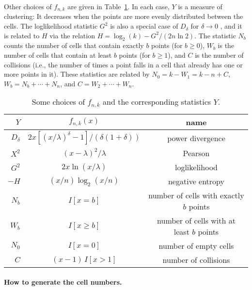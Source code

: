 Other choices of $f_{n,k}$ are given in Table~\ref{tab:choosef}.
In each case, $Y$ is a measure of clustering: It decreases
when the points are more evenly distributed between the cells.
The loglikelihood statistic $G^2$ is also a
  special case of $D_\delta$
for $\delta\to 0$ \cite{tREA88a}, and it is related to $H$ via the relation
$H = \log_2(k) - {G^2 / (2n \ln 2)}$.
The statistic $N_b$ counts the number of cells that
contain exactly $b$ points (for $b\ge 0$), $W_b$ is the number of cells that
contain at least $b$ points (for $b\ge 1$),  %
and $C$ is the number of collisions
(i.e., the number of times a point falls in
a cell that already has one or more points in it).
These statistics are related by $N_0 = k - W_1 = k - n + C$,
$W_b = N_b + \cdots + N_n$, and $C = W_2 + \cdots + W_n$.


\begin{table}[htb]
\caption {Some choices of $f_{n,k}$ and the corresponding statistics $Y$.}
\label {tab:choosef}
\smallskip
\centering
\renewcommand {\arraystretch}{1.2}
\begin{tabular}{|rcc|}
\hline
 $Y$        & $f_{n,k}(x)$             &    name  \\
\hline
 $D_\delta$ & $2x[(x/\lambda)^\delta-1]/(\delta(1+\delta)) $
                                       & power divergence \rule{0pt}{16pt}\\
 $X^2$      & $(x-\lambda)^2/\lambda$  & Pearson \\
 $G^2$      & $2x\ln(x/\lambda)$       & loglikelihood \\
 $-H$       & $(x/n)\log_2(x/n)$       & negative entropy \\
 $N_b$      & $I[x = b]$       & number of cells with exactly $b$ points \\
 $W_b$      & $I[x \ge b]$     & number of cells with at least $b$ points \\
 $N_0$      & $I[x = 0]$       & number of empty cells \\
 $C$        & $(x-1)\,I[x>1]$  & number of collisions \\
\hline
\end{tabular}
\end{table}


\paragraph*{How to generate the cell numbers.} \

